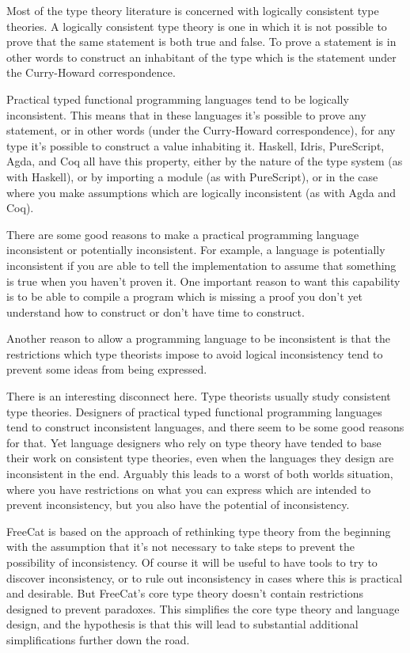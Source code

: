 \documentclass{article}
\begin{document}
Most of the type theory literature is concerned with logically consistent type theories. A logically consistent type theory is one in which it is not possible to prove that the same statement is both true and false. To prove a statement is in other words to construct an inhabitant of the type which is the statement under the Curry-Howard correspondence.

Practical typed functional programming languages tend to be logically inconsistent. This means that in these languages it's possible to prove any statement, or in other words (under the Curry-Howard correspondence), for any type it's possible to construct a value inhabiting it. Haskell, Idris, PureScript, Agda, and Coq all have this property, either by the nature of the type system (as with Haskell), or by importing a module (as with PureScript), or in the case where you make assumptions which are logically inconsistent (as with Agda and Coq).

There are some good reasons to make a practical programming language inconsistent or potentially inconsistent. For example, a language is potentially inconsistent if you are able to tell the implementation to assume that something is true when you haven't proven it. One important reason to want this capability is to be able to compile a program which is missing a proof you don't yet understand how to construct or don't have time to construct.

Another reason to allow a programming language to be inconsistent is that the restrictions which type theorists impose to avoid logical inconsistency tend to prevent some ideas from being expressed.

There is an interesting disconnect here. Type theorists usually study consistent type theories. Designers of practical typed functional programming languages tend to construct inconsistent languages, and there seem to be some good reasons for that. Yet language designers who rely on type theory have tended to base their work on consistent type theories, even when the languages they design are inconsistent in the end. Arguably this leads to a worst of both worlds situation, where you have restrictions on what you can express which are intended to prevent inconsistency, but you also have the potential of inconsistency.

FreeCat is based on the approach of rethinking type theory from the beginning with the assumption that it's not necessary to take steps to prevent the possibility of inconsistency. Of course it will be useful to have tools to try to discover inconsistency, or to rule out inconsistency in cases where this is practical and desirable. But FreeCat's core type theory doesn't contain restrictions designed to prevent paradoxes. This simplifies the core type theory and language design, and the hypothesis is that this will lead to substantial additional simplifications further down the road.
\end{document}
